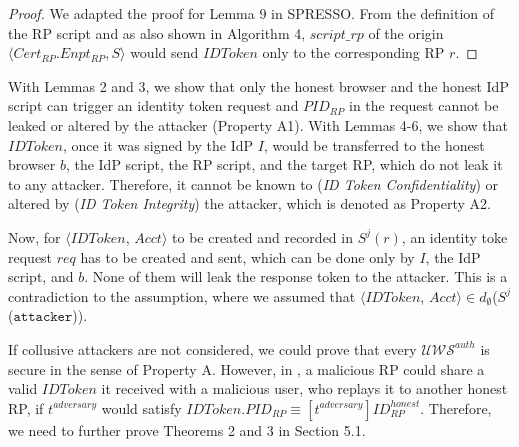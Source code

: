 \begin{proof}
We adapted the proof for Lemma 9 in SPRESSO. 
From the definition of the RP script and as also shown in Algorithm 4, %
$script\_rp$ of the origin $\langle Cert_{RP}.Enpt_{RP}, S \rangle$ would send $IDToken$ only to the corresponding RP $r$. 
\end{proof}

\vspace{2mm}

With Lemmas 2 and 3, we show that only the honest browser and the honest IdP script can trigger an identity token request and $PID_{RP}$ in the request cannot be leaked or altered by the attacker (Property A1). 
With Lemmas 4-6, we show that $IDToken$, once it was signed by the IdP $I$, would be transferred to the honest browser $b$, the IdP script, the RP script, and the target RP, which do not leak it to any attacker. Therefore, it cannot be known to ({\em ID Token Confidentiality}) or altered by ({\em ID Token Integrity}) the attacker, which is denoted as Property A2.

Now, for $\langle IDToken$, $Acct \rangle$ to be created and recorded in $S^j(r)$, an identity toke request $req$ has to be created and sent, which can be done only by $I$, the IdP script, and $b$. None of them will leak the response token to the attacker. This is a contradiction to the assumption, where we assumed that $\langle IDToken$, $Acct \rangle \in d_{\emptyset}$($S^j$($\mathtt{attacker}$)). 

If collusive attackers are not considered, we could prove that every $\mathcal{UWS}^{auth}$ is secure in the sense of Property A. However, in \usso, a malicious RP could share a valid $IDToken$ it received with a malicious user, who replays it to another honest RP, if $t^{adversary}$ would satisfy $IDToken.PID_{RP} \equiv [t^{adversary}]ID_{RP}^{honest}$. Therefore, we need to further prove Theorems 2 and 3 in Section 5.1.


